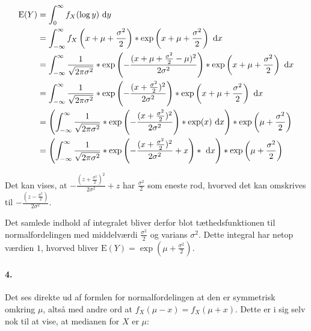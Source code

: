 \begin{align*}
\mathrm{E}(Y) &= \int_0^\infty f_X(\log y)\ \mathrm{d} y \\
&= \int_{-\infty}^\infty
     f_X\left(x + \mu + \frac{\sigma^2}{2}\right) *
     \mathrm{exp}\left(x + \mu + \frac{\sigma^2}{2}\right)
   \ \mathrm{d} x \\
&= \int_{-\infty}^\infty
     \frac{1}{\sqrt{2\pi\sigma^2}} *
     \mathrm{exp}\left(-\frac{(x + \mu + \frac{\sigma^2}{2} - \mu)^2}{2\sigma^2}\right) *
     \mathrm{exp}\left(x + \mu + \frac{\sigma^2}{2}\right)
   \ \mathrm{d} x \\
&= \int_{-\infty}^\infty
     \frac{1}{\sqrt{2\pi\sigma^2}} *
     \mathrm{exp}\left(-\frac{(x + \frac{\sigma^2}{2})^2}{2\sigma^2}\right) *
     \mathrm{exp}\left(x + \mu + \frac{\sigma^2}{2}\right)
   \ \mathrm{d} x \\
&= \left(\int_{-\infty}^\infty
     \frac{1}{\sqrt{2\pi\sigma^2}} *
     \mathrm{exp}\left(-\frac{(x + \frac{\sigma^2}{2})^2}{2\sigma^2}\right) *
     \mathrm{exp}(x)
   \ \mathrm{d} x\right) * \exp\left(\mu + \frac{\sigma^2}{2}\right) \\
&= \left (\int_{-\infty}^\infty
     \frac{1}{\sqrt{2\pi\sigma^2}} *
     \mathrm{exp}\left(-\frac{(x + \frac{\sigma^2}{2})^2}{2\sigma^2} + x\right) *
   \ \mathrm{d} x\right) * \exp\left(\mu + \frac{\sigma^2}{2}\right) \\
\end{align*}

Det kan vises, at $-\frac{(z + \frac{\sigma^2}{2})^2}{2\sigma^2} + z$ har
$\frac{\sigma^2}{2}$ som eneste rod, hvorved det kan omskrives til
$-\frac{(z - \frac{\sigma^2}{2})}{2\sigma^2}$.

Det samlede indhold af integralet bliver derfor blot tæthedsfunktionen til
normalfordelingen med middelværdi $\frac{\sigma^2}{2}$ og varians $\sigma^2$.
Dette integral har netop værdien $1$, hvorved bliver $\mathrm{E}(Y) =
\exp\left(\mu + \frac{\sigma^2}{2}\right)$.

\paragraph{4.} Det ses direkte ud af formlen for normalfordelingen at den er
symmetrisk omkring $\mu$, altså med andre ord at $f_X(\mu - x) = f_X(\mu +
x)$. Dette er i sig selv nok til at vise, at medianen for $X$ er $\mu$:

